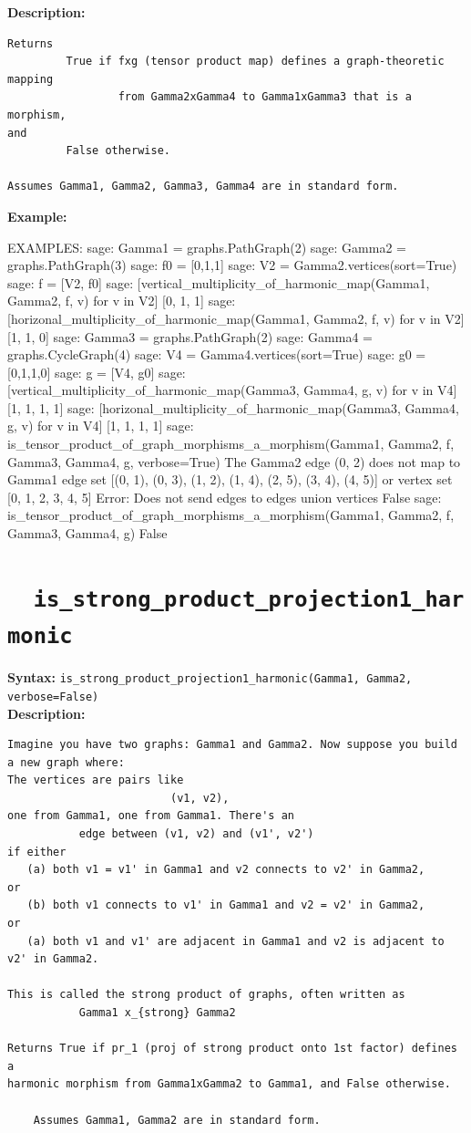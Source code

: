 \documentclass{article}
\begin{document}
\textbf{Description:}
\begin{verbatim}
Returns 
         True if fxg (tensor product map) defines a graph-theoretic mapping
                 from Gamma2xGamma4 to Gamma1xGamma3 that is a morphism, 
and 
         False otherwise. 

Assumes Gamma1, Gamma2, Gamma3, Gamma4 are in standard form.
\end{verbatim}

\noindent
\textbf{Example:}
{\small{
\begin{spverbatim}
EXAMPLES:
    sage: Gamma1 = graphs.PathGraph(2)
    sage: Gamma2 = graphs.PathGraph(3)
    sage: f0 = [0,1,1]       
    sage: V2 = Gamma2.vertices(sort=True) 
    sage: f = [V2, f0]     
    sage: [vertical_multiplicity_of_harmonic_map(Gamma1, Gamma2, f, v) for v in V2] 
    [0, 1, 1]
    sage: [horizonal_multiplicity_of_harmonic_map(Gamma1, Gamma2, f, v) for v in V2]
    [1, 1, 0]
    sage: Gamma3 = graphs.PathGraph(2) 
    sage: Gamma4 = graphs.CycleGraph(4) 
    sage: V4 = Gamma4.vertices(sort=True) 
    sage: g0 = [0,1,1,0]     
    sage: g = [V4, g0]  
    sage: [vertical_multiplicity_of_harmonic_map(Gamma3, Gamma4, g, v) for v in V4] 
    [1, 1, 1, 1]
    sage: [horizonal_multiplicity_of_harmonic_map(Gamma3, Gamma4, g, v) for v in V4]  
    [1, 1, 1, 1]
    sage: is_tensor_product_of_graph_morphisms_a_morphism(Gamma1, Gamma2, f, Gamma3, Gamma4, g, verbose=True)  
    The Gamma2 edge (0, 2)  does not map to Gamma1 edge set 
      [(0, 1), (0, 3), (1, 2), (1, 4), (2, 5), (3, 4), (4, 5)]  or vertex set  [0, 1, 2, 3, 4, 5]
    Error: Does not send edges to {edges} union {vertices}
    False
    sage: is_tensor_product_of_graph_morphisms_a_morphism(Gamma1, Gamma2, f, Gamma3, Gamma4, g) 
    False
\end{spverbatim}
}}

\section{\tt \ \ is\_strong\_product\_projection1\_harmonic}

\textbf{Syntax:} \verb}is_strong_product_projection1_harmonic(Gamma1, Gamma2, verbose=False)}\\

\textbf{Description:}
\begin{verbatim}
Imagine you have two graphs: Gamma1 and Gamma2. Now suppose you build a new graph where:
The vertices are pairs like 
                         (v1, v2),
one from Gamma1, one from Gamma1. There's an 
           edge between (v1, v2) and (v1', v2') 
if either 
   (a) both v1 = v1' in Gamma1 and v2 connects to v2' in Gamma2,
or
   (b) both v1 connects to v1' in Gamma1 and v2 = v2' in Gamma2,
or
   (a) both v1 and v1' are adjacent in Gamma1 and v2 is adjacent to v2' in Gamma2.

This is called the strong product of graphs, often written as 
           Gamma1 x_{strong} Gamma2

Returns True if pr_1 (proj of strong product onto 1st factor) defines a 
harmonic morphism from Gamma1xGamma2 to Gamma1, and False otherwise. 

    Assumes Gamma1, Gamma2 are in standard form.
\end{verbatim}
\end{document}
